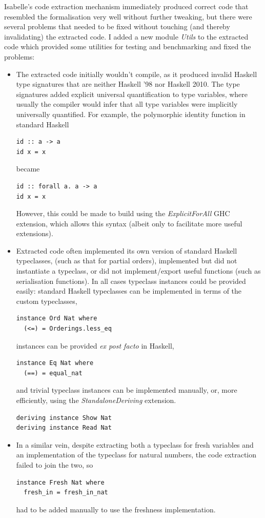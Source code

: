 Isabelle's code extraction mechanism immediately produced correct code that resembled the formalisation very well without further tweaking, but there were several problems that needed to be fixed without touching (and thereby invalidating) the extracted code.
I added a new module \emph{Utils} to the extracted code which provided some utilities for testing and benchmarking and fixed the problems:
\begin{itemize}
\item
The extracted code initially wouldn't compile, as it produced invalid Haskell type signatures that are neither Haskell '98 nor Haskell 2010.
The type signatures added explicit universal quantification to type variables, where usually the compiler would infer that all type variables were implicitly universally quantified.
For example, the polymorphic identity function in standard Haskell
\begin{verbatim}
id :: a -> a
id x = x
\end{verbatim}
became
\begin{verbatim}
id :: forall a. a -> a
id x = x
\end{verbatim}
However, this could be made to build using the \emph{ExplicitForAll} GHC extension, which allows this syntax (albeit only to facilitate more useful extensions).
\item
Extracted code often implemented its own version of standard Haskell typeclasses, (such as that for partial orders), implemented but did not instantiate a typeclass, or did not implement/export useful functions (such as serialisation functions).
In all cases typeclass instances could be provided easily:
standard Haskell typeclasses can be implemented in terms of the custom typeclasses,
\begin{verbatim}
instance Ord Nat where
  (<=) = Orderings.less_eq
\end{verbatim}
instances can be provided \emph{ex post facto} in Haskell,
\begin{verbatim}
instance Eq Nat where
  (==) = equal_nat
\end{verbatim}
and trivial typeclass instances can be implemented manually, or, more efficiently, using the \emph{StandaloneDeriving} extension.
\begin{verbatim}
deriving instance Show Nat
deriving instance Read Nat
\end{verbatim}
\item
In a similar vein, despite extracting both a typeclass for fresh variables and an implementation of the typeclass for natural numbers, the code extraction failed to join the two, so
\begin{verbatim}
instance Fresh Nat where
  fresh_in = fresh_in_nat
\end{verbatim}
had to be added manually to use the freshness implementation.
\end{itemize}
